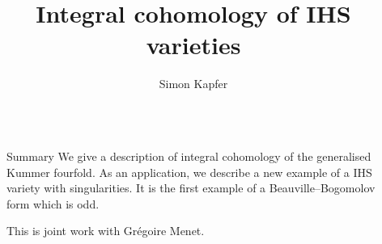 \documentclass[final]{beamer}
\title{Integral cohomology of IHS varieties} %
\author{Simon Kapfer} %
\institute{Augsburg University} %
\newlength{\sepwid}
\newlength{\onecolwid}
\begin{document}

\setlength{\belowcaptionskip}{2ex} %
\setlength\belowdisplayshortskip{2ex} %

\begin{frame}[t] %

\begin{columns}[t] %

\begin{column}{\sepwid}\end{column} %

\begin{column}{\onecolwid} %

\begin{alertblock}{Summary}
We give a description of integral cohomology of the generalised Kummer fourfold. 
As an application, we describe a new example of a IHS variety with singularities. 
It is the first example of a Beauville--Bogomolov form which is odd.

This is joint work with Gr\'egoire Menet.
\end{alertblock}





\end{column}
\end{columns}
\end{frame}
\end{document}

